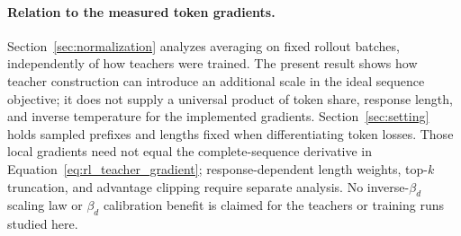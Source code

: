 \paragraph{Relation to the measured token gradients.}
Section~\ref{sec:normalization} analyzes averaging on fixed rollout
batches, independently of how teachers were trained. The present
result shows how teacher construction can introduce an additional
scale in the ideal sequence objective; it does not supply a universal
product of token share, response length, and inverse temperature for
the implemented gradients. Section~\ref{sec:setting} holds sampled
prefixes and lengths fixed when differentiating token losses.
Those local gradients need not equal the complete-sequence derivative
in Equation~\ref{eq:rl_teacher_gradient}; response-dependent length
weights, top-$k$ truncation, and advantage clipping require separate
analysis. No inverse-$\beta_d$ scaling law or $\beta_d$ calibration
benefit is claimed for the teachers or training runs studied here.
